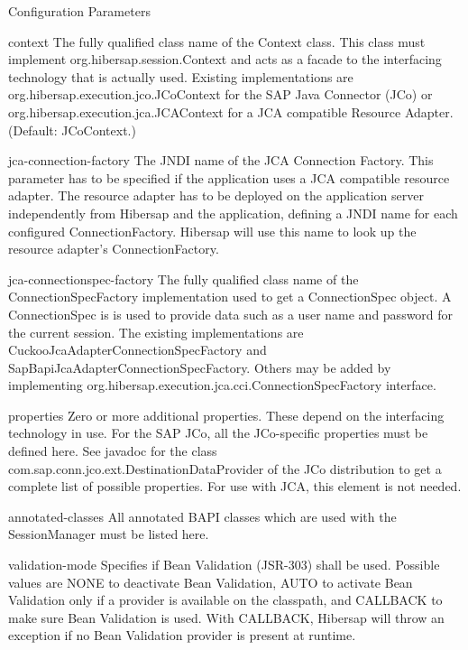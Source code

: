 \begin{descriptionBlock}{Configuration Parameters}
\begin{sloppypar}
\item[context]
    The fully qualified class name of the Context class. This class must implement \mbox{org.hibersap.session.Context}
    and acts as a facade to
    the interfacing technology that is actually used. Existing 
    implementations are org.hibersap.execution.jco.JCoContext for the SAP Java Connector (JCo) or org.hibersap.execution.jca.JCAContext 
    for a JCA compatible Resource Adapter. (Default: JCoContext.) 
\item[jca-connection-factory]
    The JNDI name of the JCA Connection Factory. This parameter has to be specified if the application uses a JCA compatible resource 
    adapter. The resource adapter has to be deployed on the application server independently from Hibersap and the application, defining 
    a JNDI name for each configured ConnectionFactory. Hibersap will use this name to look up the resource adapter's ConnectionFactory. 
\item[jca-connectionspec-factory]
    The fully qualified class name of the ConnectionSpecFactory implementation used to get a ConnectionSpec object. A ConnectionSpec is
    is used to provide data such as a user name and password for the current session. The existing implementations are 
    CuckooJcaAdapterConnectionSpecFactory and SapBapiJcaAdapterConnectionSpecFactory. Others may be added by implementing
    org.hibersap.execution.jca.cci.ConnectionSpecFactory interface.
\item[properties]
    Zero or more additional properties. These depend on the interfacing technology in use. For the SAP JCo, all the JCo-specific 
    properties must be defined here. See javadoc for the class com.sap.conn.jco.ext.DestinationDataProvider of the JCo distribution 
    to get a complete list of possible properties. For use with JCA, this element is not needed.
\item[annotated-classes]
    All annotated BAPI classes which are used with the SessionManager must be listed here. 
\item[validation-mode]
    Specifies if Bean Validation (JSR-303) shall be used. Possible values are NONE to deactivate Bean Validation, 
    AUTO to activate Bean Validation only if a provider is available on the classpath, and CALLBACK to make sure 
    Bean Validation is used. With CALLBACK, Hibersap will throw an exception if no Bean Validation provider is 
    present at runtime.

\end{sloppypar}
\end{descriptionBlock}
